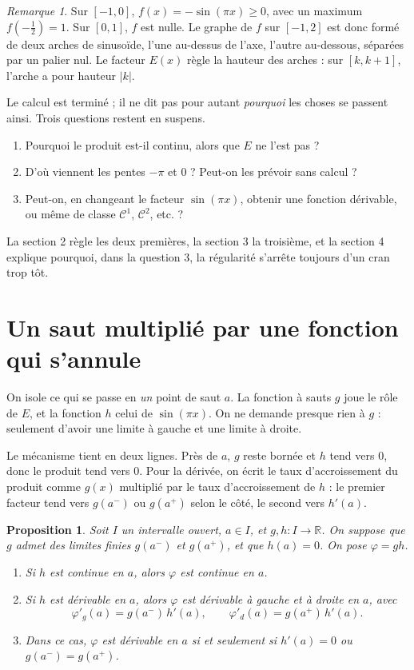 \documentclass[11pt,a4paper]{article}
\theoremstyle{plain}
\newtheorem{proposition}[theoreme]{Proposition}
\theoremstyle{definition}
\theoremstyle{remark}
\newtheorem{remarque}[theoreme]{Remarque}
\newcommand{\R}{\mathbb{R}}
\newcommand{\Cc}{\mathcal{C}}
\newcommand{\1}{\mathbf{1}}
\begin{document}
\begin{remarque}
Sur $[-1,0]$, $f(x)=-\sin(\pi x)\geq0$, avec un maximum $f(-\tfrac12)=1$. Sur $[0,1]$, $f$ est nulle. Le graphe de $f$ sur $[-1,2]$ est donc formé de deux arches de sinusoïde, l'une au-dessus de l'axe, l'autre au-dessous, séparées par un palier nul. Le facteur $E(x)$ règle la hauteur des arches : sur $[k,k+1]$, l'arche a pour hauteur $|k|$.
\end{remarque}

Le calcul est terminé ; il ne dit pas pour autant \emph{pourquoi} les choses se passent ainsi. Trois questions restent en suspens.
\begin{enumerate}[nosep]
\item Pourquoi le produit est-il continu, alors que $E$ ne l'est pas ?
\item D'où viennent les pentes $-\pi$ et $0$ ? Peut-on les prévoir sans calcul ?
\item Peut-on, en changeant le facteur $\sin(\pi x)$, obtenir une fonction dérivable, ou même de classe $\Cc^1$, $\Cc^2$, etc. ?
\end{enumerate}
La section 2 règle les deux premières, la section 3 la troisième, et la section 4 explique pourquoi, dans la question 3, la régularité s'arrête toujours d'un cran trop tôt.

\section{Un saut multiplié par une fonction qui s'annule}

On isole ce qui se passe en \emph{un} point de saut $a$. La fonction à sauts $g$ joue le rôle de $E$, et la fonction $h$ celui de $\sin(\pi x)$. On ne demande presque rien à $g$ : seulement d'avoir une limite à gauche et une limite à droite.

Le mécanisme tient en deux lignes. Près de $a$, $g$ reste bornée et $h$ tend vers $0$, donc le produit tend vers $0$. Pour la dérivée, on écrit le taux d'accroissement du produit comme $g(x)$ multiplié par le taux d'accroissement de $h$ : le premier facteur tend vers $g(a^-)$ ou $g(a^+)$ selon le côté, le second vers $h'(a)$.

\begin{proposition}\label{prop:produit}
Soit $I$ un intervalle ouvert, $a\in I$, et $g,h\colon I\to\R$. On suppose que $g$ admet des limites finies $g(a^-)$ et $g(a^+)$, et que $h(a)=0$. On pose $\varphi=gh$.
\begin{enumerate}[nosep]
\item Si $h$ est continue en $a$, alors $\varphi$ est continue en $a$.
\item Si $h$ est dérivable en $a$, alors $\varphi$ est dérivable à gauche et à droite en $a$, avec
\[
  \varphi'_g(a)=g(a^-)\,h'(a), \qquad \varphi'_d(a)=g(a^+)\,h'(a).
\]
\item Dans ce cas, $\varphi$ est dérivable en $a$ si et seulement si $h'(a)=0$ ou $g(a^-)=g(a^+)$.
\end{enumerate}
\end{proposition}
\end{document}
